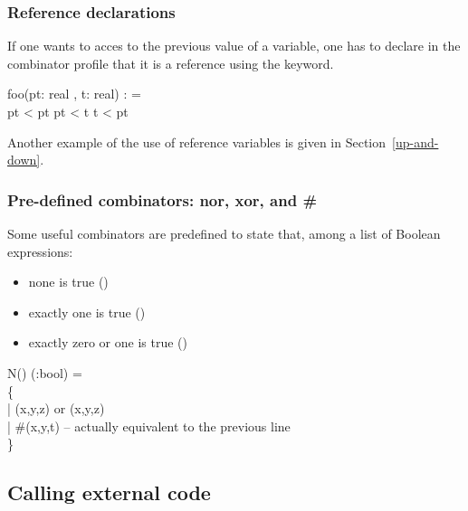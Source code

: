 \subsubsection{Reference declarations}
\label{ref-declaration}

If one wants to acces to the previous value of a variable, one has to
declare in  the combinator profile that  it is a  reference using the
 keyword.


\begin{example}
\begin{program}
 foo(pt: real , t: real) :  = \\
       \>   pt < pt  pt < t  t < pt 
\end{program}
\end{example}

Another  example  of the  use  of  reference  variables is  given  in
Section~\ref{up-and-down}.

\subsubsection{Pre-defined combinators: nor, xor, and \#}
\label{Pre-defined-combinators}

Some useful combinators are predefined to state that, among a list of
Boolean expressions:

\begin{itemize}
\item none is true ()
\item exactly one is true ()
\item exactly zero or one is true (\key{\#})
\end{itemize}


\begin{example}
  \begin{program}
     N()  (:bool) = \\
        \{ \\
          | (x,y,z) or (x,y,z) \\
          | \#(x,y,t) -- actually equivalent to the previous line\\
        \}
\end{program}
\end{example}



\subsection{Calling external code}


